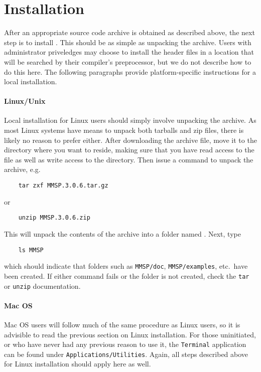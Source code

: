 \section{Installation}
After an appropriate source code archive is obtained as described above, the next step is to install \MMSP.  This should be as simple as unpacking the archive.  Users with administrator priveledges may choose to install the \MMSP header files in a location that will be searched by their compiler's preprocessor, but we do not describe how to do this here.  The following paragraphs provide platform-specific instructions for a local installation.

\paragraph{Linux/Unix}
Local installation for Linux users should simply involve unpacking the archive.  As most Linux systems have means to unpack both tarballs and zip files, there is likely no reason to prefer either.  After downloading the archive file, move it to the directory where you want \MMSP to reside, making sure that you have read access to the file as well as write access to the directory.  Then issue a command to unpack the archive, e.g.
\begin{shadebox}
\begin{verbatim}
    tar zxf MMSP.3.0.6.tar.gz
\end{verbatim}
\end{shadebox}
or
\begin{shadebox}
\begin{verbatim}
    unzip MMSP.3.0.6.zip
\end{verbatim}
\end{shadebox}
This will unpack the contents of the archive into a folder named \MMSP.  Next, type
\begin{shadebox}
\begin{verbatim}
    ls MMSP
\end{verbatim}
\end{shadebox}
which should indicate that folders such as {\tt MMSP/doc}, {\tt MMSP/examples}, etc.~have been created.  If either command fails or the folder \MMSP is not created, check the {\tt tar} or {\tt unzip} documentation.

\paragraph{Mac OS}
Mac OS users will follow much of the same procedure as Linux users, so it is advisible to read the previous section on Linux installation.  For those uninitiated, or who have never had any previous reason to use it, the {\tt Terminal} application can be found under {\tt Applications/Utilities}.  Again, all steps described above for Linux installation should apply here as well.

